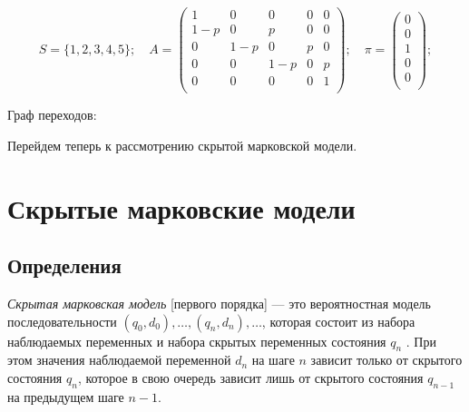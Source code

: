 \documentclass[letterpaper, 11pt]{article}
\begin{document}
$$S=\{1,2,3,4,5\};\quad
A=
\begin{pmatrix}
1 & 0 & 0 & 0 & 0\\
1-p & 0 & p & 0 & 0\\
0 & 1-p & 0 & p & 0\\
0 & 0 & 1-p & 0 & p\\
0 & 0 & 0 & 0 & 1\\
\end{pmatrix};
\quad
\pi=
\begin{pmatrix}
0\\
0\\
1\\
0\\
0\\
\end{pmatrix};
$$

Граф переходов:

\begin{center}
\end{center}


Перейдем теперь к рассмотрению скрытой марковской модели.

\section{Скрытые марковские модели}

\subsection{Определения}

\textit{Скрытая марковская модель} [первого порядка] — это вероятностная модель последовательности $(q_0, d_0), \ldots,(q_n,d_n),\ldots$, которая состоит из набора наблюдаемых переменных и набора скрытых переменных состояния $q_n$ . При этом значения наблюдаемой переменной $d_n$ на шаге $n$ зависит только от скрытого состояния $q_n$, которое в свою очередь зависит лишь от скрытого состояния $q_{n-1}$ на предыдущем шаге $n-1$.
\end{document}
